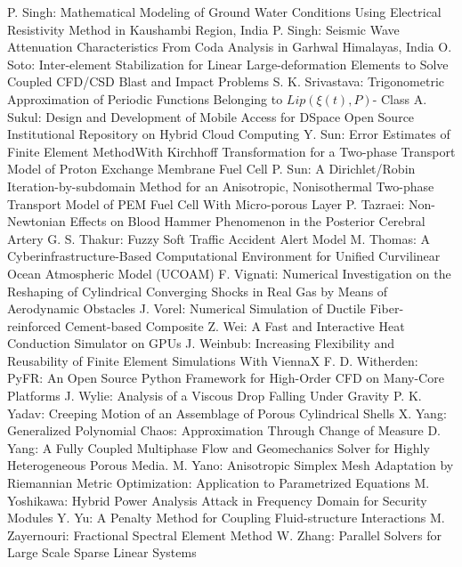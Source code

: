 \documentclass[10pt, A4]{article}%
\begin{document}
{P. Singh}: {Mathematical Modeling of Ground Water Conditions Using Electrical Resistivity Method in Kaushambi Region, India}
{P. Singh}: {Seismic Wave Attenuation Characteristics  From Coda Analysis in Garhwal Himalayas, India}
{O. Soto}: {Inter-element Stabilization for Linear Large-deformation Elements to Solve Coupled CFD/CSD Blast and Impact Problems}
{S. K. Srivastava}: {Trigonometric Approximation of Periodic Functions Belonging to $Lip(\xi(t), P)$- Class}
{A. Sukul}: {Design and Development of Mobile Access for DSpace Open Source Institutional Repository on Hybrid Cloud Computing}
{Y. Sun}: {Error Estimates of Finite Element MethodWith Kirchhoff Transformation for a Two-phase Transport Model of Proton Exchange Membrane Fuel Cell}
{P. Sun}: {A Dirichlet/Robin Iteration-by-subdomain Method for an Anisotropic, Nonisothermal Two-phase Transport Model of PEM Fuel Cell With Micro-porous Layer}
{P. Tazraei}: {Non-Newtonian Effects on Blood Hammer Phenomenon in the Posterior Cerebral Artery}
{G. S. Thakur}: {Fuzzy Soft Traffic Accident Alert Model}
{M. Thomas}: {A Cyberinfrastructure-Based Computational Environment for Unified Curvilinear Ocean Atmospheric Model  (UCOAM)}
{F. Vignati}: {Numerical Investigation on the Reshaping of Cylindrical Converging Shocks in Real Gas by Means of Aerodynamic Obstacles}
{J. Vorel}: {Numerical Simulation of Ductile Fiber-reinforced Cement-based Composite}
{Z. Wei}: {A Fast and Interactive Heat Conduction Simulator on GPUs}
{J. Weinbub}: {Increasing Flexibility and Reusability of Finite Element Simulations With ViennaX}
{F. D. Witherden}: {PyFR: An Open Source Python Framework for High-Order CFD on Many-Core Platforms}
{J. Wylie}: {Analysis of a Viscous Drop Falling Under Gravity}
{P. K. Yadav}: {Creeping Motion of an Assemblage of Porous Cylindrical Shells}
{X. Yang}: {Generalized Polynomial Chaos: Approximation Through Change of Measure}
{D. Yang}: {A Fully Coupled Multiphase Flow and Geomechanics Solver for Highly Heterogeneous Porous Media.}
{M. Yano}: {Anisotropic Simplex Mesh Adaptation by Riemannian Metric Optimization: Application to Parametrized Equations}
{M. Yoshikawa}: {Hybrid Power Analysis Attack in Frequency Domain for Security Modules}
{Y. Yu}: {A Penalty Method for Coupling Fluid-structure Interactions}
{M. Zayernouri}: {Fractional Spectral Element Method}
{W. Zhang}: {Parallel Solvers for Large Scale Sparse Linear Systems}
\end{document}
